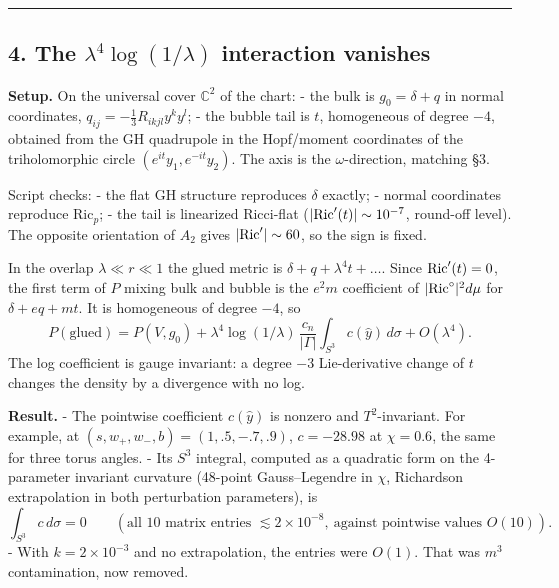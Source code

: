 \documentclass[
  10pt,
]{report}
\begin{document}
\begin{center}\rule{0.5\linewidth}{0.5pt}\end{center}

\hypertarget{the-lambda4log1lambda-interaction-vanishes}{%
\subsection{\texorpdfstring{4. The \(\lambda^4\log(1/\lambda)\)
interaction
vanishes}{4. The \textbackslash lambda\^{}4\textbackslash log(1/\textbackslash lambda) interaction vanishes}}\label{the-lambda4log1lambda-interaction-vanishes}}

\textbf{Setup.} On the universal cover \(\mathbb C^2\) of the chart: -
the bulk is \(g_0=\delta+q\) in normal coordinates,
\(q_{ij}=-\tfrac13R_{ikjl}y^ky^l\); - the bubble tail is \(t\),
homogeneous of degree \(-4\), obtained from the GH quadrupole in the
Hopf/moment coordinates of the triholomorphic circle
\((e^{it}y_1,e^{-it}y_2)\). The axis is the \(\omega\)-direction,
matching §3.

Script checks: - the flat GH structure reproduces \(\delta\) exactly; -
normal coordinates reproduce \(\mathrm{Ric}_p\); - the tail is
linearized Ricci-flat (\(|{\rm Ric}'(t)|\sim10^{-7}\), round-off level).
The opposite orientation of \(A_2\) gives \(|{\rm Ric}'|\sim60\), so the
sign is fixed.

In the overlap \(\lambda\ll r\ll1\) the glued metric is
\(\delta+q+\lambda^4t+\dots\). Since \({\rm Ric}'(t)=0\), the first term
of \(P\) mixing bulk and bubble is the \(e^2m\) coefficient of
\(|{\rm Ric}^\circ|^2d\mu\) for \(\delta+eq+mt\). It is homogeneous of
degree \(-4\), so \[
P(\text{glued})=P(V,g_0)+\lambda^4\log(1/\lambda)\,\frac{c_n}{|\Gamma|}\int_{S^3}c(\hat y)\,d\sigma+O(\lambda^4).
\] The log coefficient is gauge invariant: a degree \(-3\)
Lie-derivative change of \(t\) changes the density by a divergence with
no log.

\textbf{Result.} - The pointwise coefficient \(c(\hat y)\) is nonzero
and \(T^2\)-invariant. For example, at \((s,w_+,w_-,b)=(1,.5,-.7,.9)\),
\(c=-28.98\) at \(\chi=0.6\), the same for three torus angles. - Its
\(S^3\) integral, computed as a quadratic form on the 4-parameter
invariant curvature (48-point Gauss--Legendre in \(\chi\), Richardson
extrapolation in both perturbation parameters), is \[
  \int_{S^3}c\,d\sigma=0\qquad(\text{all 10 matrix entries }\lesssim2\times10^{-8},\ \text{against pointwise values }O(10)).
  \] - With \(k=2\times10^{-3}\) and no extrapolation, the entries were
\(O(1)\). That was \(m^3\) contamination, now removed.
\end{document}
